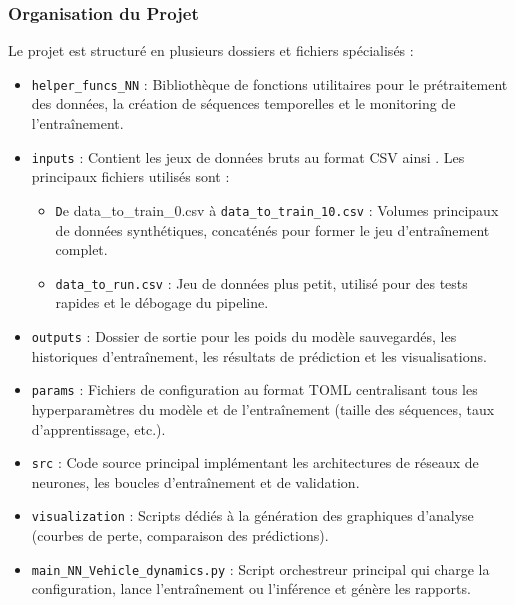 \documentclass[12pt, a4paper]{report}
\begin{document}
\subsubsection{Organisation du Projet}
Le projet est structuré en plusieurs dossiers et fichiers spécialisés :
\begin{itemize}
    \item \texttt{helper\_funcs\_NN} : Bibliothèque de fonctions utilitaires pour le prétraitement des données, la création de séquences temporelles et le monitoring de l'entraînement.
    \item \texttt{inputs} : Contient les jeux de données bruts au format CSV ainsi . Les principaux fichiers utilisés sont :
    \begin{itemize}
        \item \texttt De {data\_to\_train\_0.csv} à  \texttt{data\_to\_train\_10.csv}  : Volumes principaux de données synthétiques, concaténés pour former le jeu d'entraînement complet.
        \item \texttt{data\_to\_run.csv}  : Jeu de données plus petit, utilisé pour des tests rapides et le débogage du pipeline.
    \end{itemize}
    \item \texttt{outputs} : Dossier de sortie pour les poids du modèle sauvegardés, les historiques d'entraînement, les résultats de prédiction et les visualisations.
    \item \texttt{params} : Fichiers de configuration au format TOML centralisant tous les hyperparamètres du modèle et de l'entraînement (taille des séquences, taux d'apprentissage, etc.).
    \item \texttt{src} : Code source principal implémentant les architectures de réseaux de neurones, les boucles d'entraînement et de validation.
    \item \texttt{visualization} : Scripts dédiés à la génération des graphiques d'analyse (courbes de perte, comparaison des prédictions).
    \item \texttt{main\_NN\_Vehicle\_dynamics.py} : Script orchestreur principal qui charge la configuration, lance l'entraînement ou l'inférence et génère les rapports.
\end{itemize}
\end{document}
